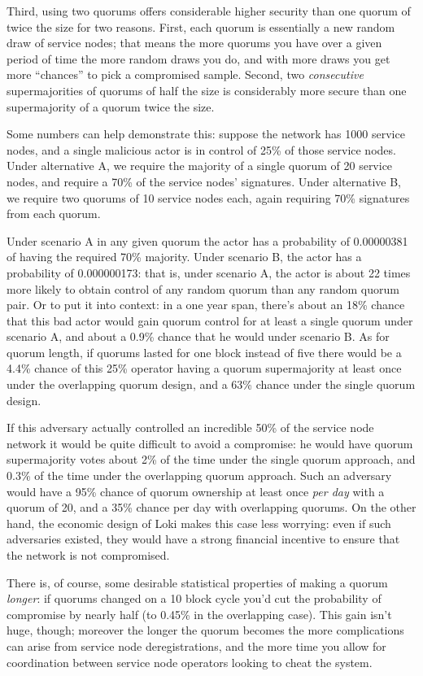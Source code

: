 Third, using two quorums offers considerable higher security than one
quorum of twice the size for two reasons. First, each quorum is
essentially a new random draw of service nodes; that means the more
quorums you have over a given period of time the more random draws you
do, and with more draws you get more ``chances'' to pick a compromised
sample. Second, two \emph{consecutive} supermajorities of quorums of
half the size is considerably more secure than one supermajority of a
quorum twice the size.

Some numbers can help demonstrate this: suppose the network has 1000
service nodes, and a single malicious actor is in control of 25\% of
those service nodes. Under alternative A, we require the majority of a
single quorum of 20 service nodes, and require a 70\% of the service
nodes' signatures. Under alternative B, we require two quorums of 10
service nodes each, again requiring 70\% signatures from each quorum.

Under scenario A in any given quorum the actor has a probability of
0.00000381 of having the required 70\% majority. Under scenario B, the
actor has a probability of 0.000000173: that is, under scenario A, the
actor is about 22 times more likely to obtain control of any random
quorum than any random quorum pair. Or to put it into context: in a one
year span, there's about an 18\% chance that this bad actor would gain
quorum control for at least a single quorum under scenario A, and about
a 0.9\% chance that he would under scenario B. As for quorum length, if
quorums lasted for one block instead of five there would be a 4.4\%
chance of this 25\% operator having a quorum supermajority at least once
under the overlapping quorum design, and a 63\% chance under the single
quorum design.

If this adversary actually controlled an incredible 50\% of the service
node network it would be quite difficult to avoid a compromise: he would
have quorum supermajority votes about 2\% of the time under the single
quorum approach, and 0.3\% of the time under the overlapping quorum
approach. Such an adversary would have a 95\% chance of quorum ownership
at least once \emph{per day} with a quorum of 20, and a 35\% chance per
day with overlapping quorums. On the other hand, the economic design of
Loki makes this case less worrying: even if such adversaries existed,
they would have a strong financial incentive to ensure that the network
is not compromised.

There is, of course, some desirable statistical properties of making a
quorum \emph{longer}: if quorums changed on a 10 block cycle you'd cut
the probability of compromise by nearly half (to 0.45\% in the
overlapping case). This gain isn't huge, though; moreover the longer the
quorum becomes the more complications can arise from service node
deregistrations, and the more time you allow for coordination between
service node operators looking to cheat the system.

